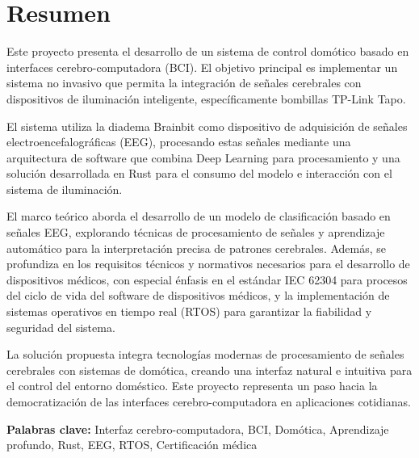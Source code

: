 \chapter*{Resumen}

Este proyecto presenta el desarrollo de un sistema de control domótico basado en interfaces cerebro-computadora (BCI). El objetivo principal es implementar un sistema no invasivo que permita la integración de señales cerebrales con dispositivos de iluminación inteligente, específicamente bombillas TP-Link Tapo.

El sistema utiliza la diadema Brainbit como dispositivo de adquisición de señales electroencefalográficas (EEG), procesando estas señales mediante una arquitectura de software que combina Deep Learning para procesamiento y una solución desarrollada en Rust para el consumo del modelo e interacción con el sistema de iluminación. 

El marco teórico aborda el desarrollo de un modelo de clasificación basado en señales EEG, explorando técnicas de procesamiento de señales y aprendizaje automático para la interpretación precisa de patrones cerebrales. Además, se profundiza en los requisitos técnicos y normativos necesarios para el desarrollo de dispositivos médicos, con especial énfasis en el estándar IEC 62304 para procesos del ciclo de vida del software de dispositivos médicos, y la implementación de sistemas operativos en tiempo real (RTOS) para garantizar la fiabilidad y seguridad del sistema.

La solución propuesta integra tecnologías modernas de procesamiento de señales cerebrales con sistemas de domótica, creando una interfaz natural e intuitiva para el control del entorno doméstico. Este proyecto representa un paso hacia la democratización de las interfaces cerebro-computadora en aplicaciones cotidianas.

\vspace{0.5cm}
\noindent\textbf{Palabras clave:} Interfaz cerebro-computadora, BCI, Domótica, Aprendizaje profundo, Rust, EEG, RTOS, Certificación médica

